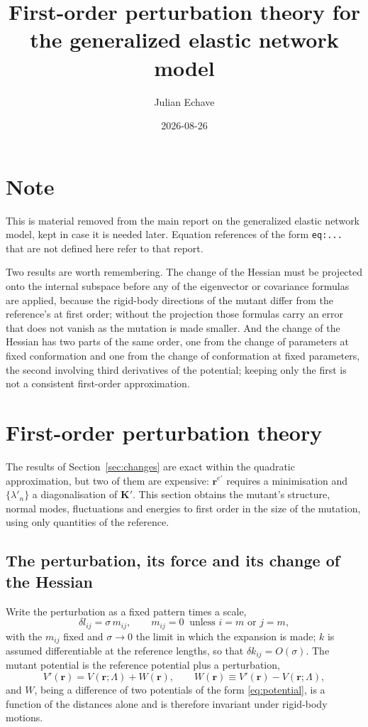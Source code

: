 \documentclass[11pt]{article}
\title{First-order perturbation theory for the generalized elastic network model}
\author{Julian Echave}
\date{2026-08-26}
\newcommand{\rr}{\mathbf{r}}
\newcommand{\KK}{\mathbf{K}}
\newcommand{\LL}{\Lambda}
\newcommand{\rem}{\rr^{e\prime}}   %
\newcommand{\dlij}{\delta l_{ij}}
\newcommand{\dkij}{\delta k_{ij}}
\begin{document}
\maketitle


\section*{Note}

This is material removed from the main report on the generalized elastic network
model, kept in case it is needed later. Equation references of the form
\texttt{eq:...} that are not defined here refer to that report.

Two results are worth remembering. The change of the Hessian must be projected
onto the internal subspace before any of the eigenvector or covariance formulas
are applied, because the rigid-body directions of the mutant differ from the
reference's at first order; without the projection those formulas carry an error
that does not vanish as the mutation is made smaller. And the change of the
Hessian has two parts of the same order, one from the change of parameters at
fixed conformation and one from the change of conformation at fixed parameters,
the second involving third derivatives of the potential; keeping only the first
is not a consistent first-order approximation.

\section{First-order perturbation theory}
\label{sec:perturbation}

The results of Section~\ref{sec:changes} are exact within the quadratic approximation, but two of them are expensive: $\rem$ requires a minimisation and $\{\lambda'_n\}$ a diagonalisation of $\KK'$.
This section obtains the mutant's structure, normal modes, fluctuations and energies to first order in the size of the mutation, using only quantities of the reference.

\subsection*{The perturbation, its force and its change of the Hessian}

Write the perturbation as a fixed pattern times a scale,
\begin{equation}
\dlij = \sigma\, m_{ij},
\qquad
m_{ij} = 0 \ \text{ unless } i = m \text{ or } j = m,
\label{eq:mutation-scale}
\end{equation}
with the $m_{ij}$ fixed and $\sigma \to 0$ the limit in which the expansion is made; $k$ is assumed differentiable at the reference lengths, so that $\dkij = O(\sigma)$.
The mutant potential is the reference potential plus a perturbation,
\begin{equation}
V'(\rr) = V(\rr;\LL) + W(\rr),
\qquad
W(\rr) \equiv V'(\rr) - V(\rr;\LL),
\label{eq:perturbation}
\end{equation}
and $W$, being a difference of two potentials of the form \eqref{eq:potential}, is a function of the distances alone and is therefore invariant under rigid-body motions.
\end{document}
